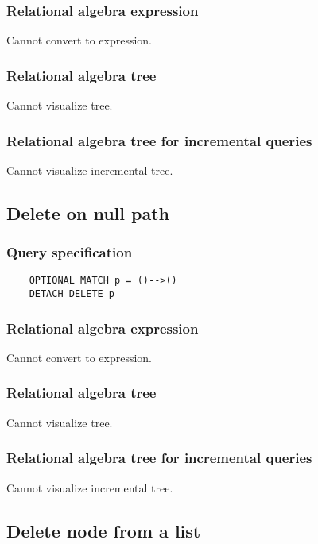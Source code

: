 	\subsubsection*{Relational algebra expression}

	Cannot convert to expression.

	\subsubsection*{Relational algebra tree}

	Cannot visualize tree.

	\subsubsection*{Relational algebra tree for incremental queries}

	Cannot visualize incremental tree.
	\subsection{Delete on null path}

	\subsubsection*{Query specification}

	\begin{lstlisting}
	OPTIONAL MATCH p = ()-->()
	DETACH DELETE p
	\end{lstlisting}


	\subsubsection*{Relational algebra expression}

	Cannot convert to expression.

	\subsubsection*{Relational algebra tree}

	Cannot visualize tree.

	\subsubsection*{Relational algebra tree for incremental queries}

	Cannot visualize incremental tree.
	\subsection{Delete node from a list}

